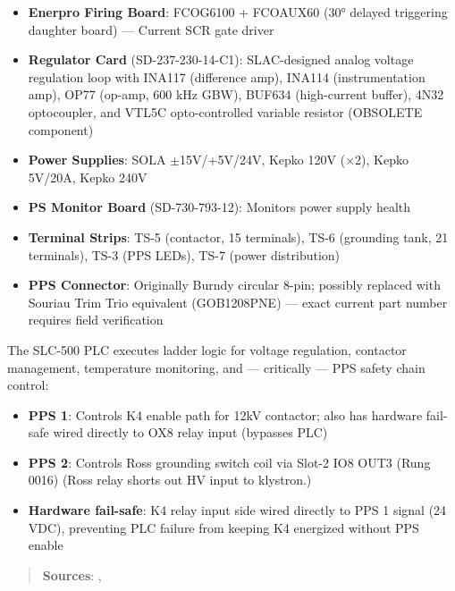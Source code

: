 \begin{itemize}
\tightlist
\item
  \textbf{Enerpro Firing Board}: FCOG6100 + FCOAUX60 (30° delayed triggering daughter board) --- Current SCR gate driver
\item
  \textbf{Regulator Card} (SD-237-230-14-C1): SLAC-designed analog voltage regulation loop with INA117 (difference amp), INA114 (instrumentation amp), OP77 (op-amp, 600 kHz GBW), BUF634 (high-current buffer), 4N32 optocoupler, and VTL5C opto-controlled variable resistor (OBSOLETE component)
\item
  \textbf{Power Supplies}: SOLA $\pm$15V/+5V/24V, Kepko 120V (×2), Kepko 5V/20A, Kepko 240V
\item
  \textbf{PS Monitor Board} (SD-730-793-12): Monitors power supply health
\item
  \textbf{Terminal Strips}: TS-5 (contactor, 15 terminals), TS-6 (grounding tank, 21 terminals), TS-3 (PPS LEDs), TS-7 (power distribution)
\item
  \textbf{PPS Connector}: Originally Burndy circular 8-pin; possibly replaced with Souriau Trim Trio equivalent (GOB1208PNE) --- exact current part number requires field verification
\end{itemize}

The SLC-500 PLC executes ladder logic for voltage regulation, contactor management, temperature monitoring, and --- critically --- PPS safety chain control:

\begin{itemize}
\tightlist
\item
  \textbf{PPS 1}: Controls K4 enable path for 12kV contactor; also has hardware fail-safe wired directly to OX8 relay input (bypasses PLC)
\item
  \textbf{PPS 2}: Controls Ross grounding switch coil via Slot-2 IO8 OUT3 (Rung 0016) (Ross relay shorts out HV input to klystron.)
\item
  \textbf{Hardware fail-safe}: K4 relay input side wired directly to PPS 1 signal (24 VDC), preventing PLC failure from keeping K4 energized without PPS enable
\end{itemize}

\begin{quote}
\textbf{Sources}: , 
\end{quote}

